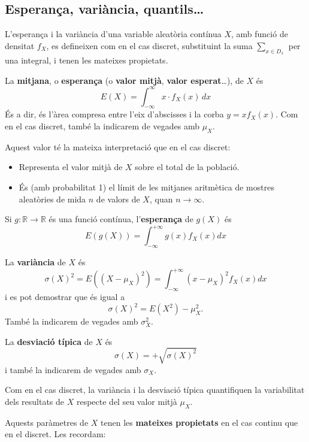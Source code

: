 \documentclass[
]{book}
\theoremstyle{definition}
\theoremstyle{definition}
\theoremstyle{definition}
\theoremstyle{remark}
\begin{document}
\hypertarget{esperanuxe7a-variuxe0ncia-quantils}{%
\subsection{Esperança, variància, quantils\ldots{}}\label{esperanuxe7a-variuxe0ncia-quantils}}

L'esperança i la variància d'una variable aleatòria contínua \(X\), amb funció de densitat \(f_X\), es defineixen com en el cas discret, substituint la suma \(\sum_{x\in D_x}\) per una integral, i tenen les mateixes propietats.

La \textbf{mitjana}, o \textbf{esperança} (o \textbf{valor mitjà}, \textbf{valor esperat}\ldots), de \(X\) és
\[
E(X)=\int_{-\infty}^{\infty}x \cdot f_{X}(x)\, dx
\]
És a dir, és l'àrea compresa entre l'eix d'abscisses i la corba \(y=xf_X(x)\).
Com en el cas discret, també la indicarem de vegades amb \(\mu_X\).

Aquest valor té la mateixa interpretació que en el cas discret:

\begin{itemize}
\item
  Representa el valor mitjà de \(X\) sobre el total de la població.
\item
  És (amb probabilitat 1) el límit de les mitjanes aritmètica de mostres aleatòries de mida \(n\) de valors de \(X\), quan \(n\to \infty\).
\end{itemize}

Si \(g:\mathbb{R}\to \mathbb{R}\) és una funció contínua, l'\textbf{esperança} de \(g(X)\) és
\[
E(g(X))=\int_{-\infty}^{+\infty} g(x) f_X(x)dx
\]

La \textbf{variància} de \(X\) és
\[
\sigma(X)^2=E((X-\mu_X)^2)=\int_{-\infty}^{+\infty} (x-\mu_X)^2 f_X(x)dx
\]
i es pot demostrar que és igual a
\[
\sigma(X)^2=E(X^2)-\mu_X^2.
\]
També la indicarem de vegades amb \(\sigma_X^2\).

La \textbf{desviació típica} de \(X\) és
\[
\sigma(X)=+\sqrt{\sigma(X)^2}
\]
i també la indicarem de vegades amb \(\sigma_X\).

Com en el cas discret, la variància i la desviació típica quantifiquen la variabilitat dels resultats de \(X\) respecte del seu valor mitjà \(\mu_X\).

Aquests paràmetres de \(X\) tenen les \textbf{mateixes propietats} en el cas continu que en el discret. Les recordam:
\end{document}
